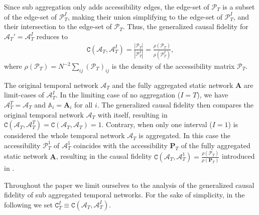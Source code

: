\documentclass[%
 reprint,
 amsmath,amssymb,
 aps,
]{revtex4-2}
\begin{document}
Since sub aggregation only adds accessibility edges, the edge-set of $\mathcal{P}_T$ is a subset of the edge-set of $\mathcal{P}^I_T$, making  their union simplifying to the edge-set of $\mathcal{P}^I_T$, and their intersection to the edge-set of $\mathcal{P}_T$. Thus, the generalized causal fidelity for  $\mathcal{A}_T' = \mathcal{A}^I_T$  reduces to 
\begin{align}
\mathtt{C}(\mathcal{A}_T,\mathcal{A}^I_T) = \frac{|\mathcal{P}_T |}{|\mathcal{P}^I_T|}=\frac{\rho (\mathcal{P}_T )}{\rho (\mathcal{P}^I_T)},
\end{align}
where $\rho (\mathcal{P}_T)=N^{-2}\sum_{ij} (\mathcal{P}_T)_{ij}$ is the density of the accessibility matrix $\mathcal{P}_T$.

The original temporal network $\mathcal{A}_T$ and the fully aggregated static network $\mathbf{A}$ are limit-cases of $\mathcal{A}^I_T$. 
In the limiting case of no aggregation ($I=T$), we have $\mathcal{A}^T_T = \mathcal{A}_T$ and $\mathbb{A}_i = \mathbf{A}_i$ for all $i$.
The generalized causal fidelity then compares the original temporal network $\mathcal{A}_T$ with itself, resulting in $\mathtt{C}(\mathcal{A}_T,\mathcal{A}^T_T)=\mathtt{C}(\mathcal{A}_T,\mathcal{A}_T)=1$. 
Contrary, when only one interval ($I=1$) is considered the whole temporal network $\mathcal{A}_T$ is aggregated. In this case the accessibility $\mathcal{P}^1_T$ of $\mathcal{A}^1_T$  coincides with the accessibility $\mathbf{P}_T$ of the fully aggregated static network $\mathbf{A}$, 
resulting in the causal fidelity $\mathtt{C}(\mathcal{A}_T,\mathcal{A}_T^1)= \frac{\rho (\mathcal{P}_T )}{\rho (\mathbf{P}_T)}$ introduced in  \cite{lentz2013unfolding}. 

Throughout the paper we limit ourselves to the analysis of the generalized causal fidelity of sub aggregated temporal networks.  For the sake of simplicity, in the following we set $\mathtt{C}^I_T \equiv \mathtt{C}(\mathcal{A}_T,\mathcal{A}^I_T)$.
\end{document}

